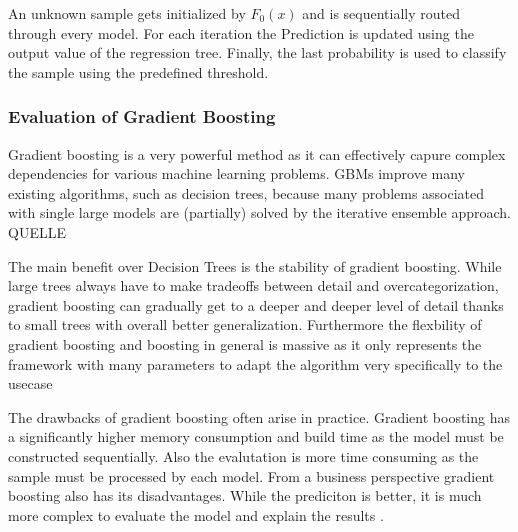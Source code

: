An unknown sample gets initialized by \(F_{0}(x)\) and is sequentially routed through every model. For each iteration the 
Prediction is updated using the output value of the regression tree. Finally, the last probability is used to classify 
the sample using the predefined threshold. 

\subsubsection{Evaluation of Gradient Boosting}

Gradient boosting is a very powerful method as it can effectively capure complex dependencies for various machine 
learning problems. \ac{GBM}s improve many existing algorithms, such as decision trees, because many problems associated 
with single large models are (partially) solved by the iterative ensemble approach. QUELLE

The main benefit over Decision Trees is the stability of gradient boosting. While large trees always have to make tradeoffs 
between detail and overcategorization, gradient boosting can gradually get to a deeper and deeper level of detail thanks to 
small trees with overall better generalization. Furthermore the flexbility of gradient boosting and boosting in general is massive 
as it only represents the framework with many parameters to adapt the algorithm very specifically to the usecase \cite[7.2]{Natekin2013}

The drawbacks of gradient boosting often arise in practice. Gradient boosting has a significantly higher memory consumption and 
build time as the model must be constructed sequentially. Also the evalutation is more time consuming as the sample must be processed 
by each model. From a business perspective gradient boosting also has its disadvantages. While the prediciton is better, it is much 
more complex to evaluate the model and explain the results \cite[7.2]{Natekin2013}. 